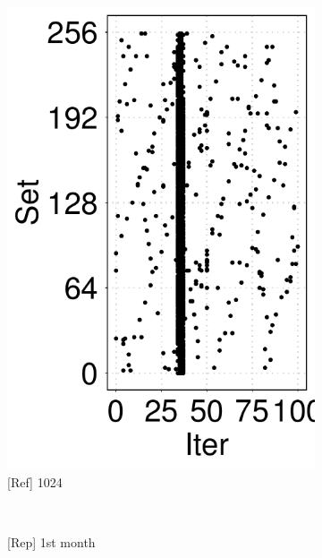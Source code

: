 \begin{figure}[t]
\begin{subfigure}[b]{.24\linewidth}
        \includegraphics[width=\linewidth]{figure/plot/reference/fig14-pmdk-kv-memory-pattern-1024.tikz.pdf}
        \caption{[Ref] 1024}
        \label{fig:14:ref:pmdk-kv-memory-pattern4}
    \end{subfigure}
    \\
    \begin{subfigure}[b]{.24\linewidth}
        \centering
        \caption{[Rep] 1st month}
        \label{fig:14:rep:pmdk-kv-memory-pattern1}
    \end{subfigure}
    \hfill
    \begin{subfigure}[b]{.24\linewidth}
        \centering

\end{subfigure}
\end{figure}
